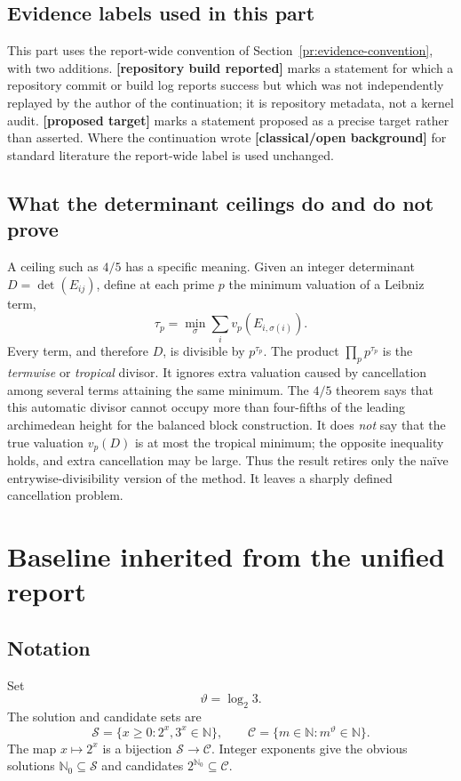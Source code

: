 \documentclass[11pt,oneside]{article}
\theoremstyle{definition}
\theoremstyle{remark}
\newcommand{\N}{\mathbb N}
\newcommand{\Nzero}{\mathbb N_0}
\newcommand{\Sol}{\mathcal S}
\newcommand{\Cand}{\mathcal C}
\newcommand{\statusknown}{\textcolor{classicalgray}{\textbf{[classical/\allowbreak open background]}}}
\newcommand{\statusrepo}{\textcolor{leanblue}{\textbf{[repository build reported]}}}
\newcommand{\statusopen}{\textcolor{classicalgray}{\textbf{[proposed target]}}}
\begin{document}
\subsection{Evidence labels used in this part}

This part uses the report-wide convention of Section~\ref{pr:evidence-convention},
with two additions.  \statusrepo{} marks a statement for which a repository
commit or build log reports success but which was not independently replayed by the
author of the continuation; it is repository metadata, not a kernel audit.
\statusopen{} marks a statement proposed as a precise target rather than asserted.
Where the continuation wrote \statusknown{} for standard literature the
report-wide label is used unchanged.

\subsection{What the determinant ceilings do and do not prove}

A ceiling such as $4/5$ has a specific meaning.  Given an integer determinant
$D=\det(E_{ij})$, define at each prime $p$ the minimum valuation of a Leibniz term,
\[
  \tau_p=\min_{\sigma}\sum_i v_p(E_{i,\sigma(i)}).
\]
Every term, and therefore $D$, is divisible by $p^{\tau_p}$.  The product
$\prod_pp^{\tau_p}$ is the \emph{termwise} or \emph{tropical} divisor.  It ignores extra
valuation caused by cancellation among several terms attaining the same minimum.  The $4/5$
theorem says that this automatic divisor cannot occupy more than four-fifths of the leading
archimedean height for the balanced block construction.  It does \emph{not} say that the true
valuation $v_p(D)$ is at most the tropical minimum; the opposite inequality holds, and extra
cancellation may be large.  Thus the result retires only the naïve entrywise-divisibility
version of the method.  It leaves a sharply defined cancellation problem.

\section{Baseline inherited from the unified report}

\subsection{Notation}

Set
\[
  \vartheta=\log_2 3.
\]
The solution and candidate sets are
\[
  \Sol=\{x\ge0:2^x,3^x\in\N\},
  \qquad
  \Cand=\{m\in\N:m^{\vartheta}\in\N\}.
\]
The map $x\mapsto2^x$ is a bijection $\Sol\to\Cand$.  Integer exponents give the obvious
solutions $\Nzero\subseteq\Sol$ and candidates $2^{\Nzero}\subseteq\Cand$.
\end{document}
